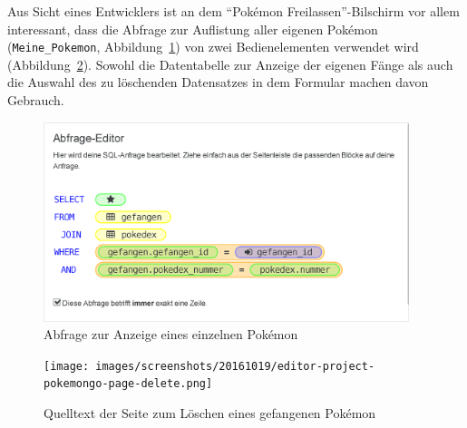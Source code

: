 Aus Sicht eines Entwicklers ist an dem "`Pokémon Freilassen"'-Bilschirm vor allem interessant, dass die Abfrage zur Auflistung aller eigenen Pokémon (\texttt{Meine\_Pokemon}, Abbildung~\ref{fig:project-pokemongo-query-single-pokemon}) von zwei Bedienelementen verwendet wird (Abbildung~\ref{fig:project-pokemongo-page-delete}). Sowohl die Datentabelle zur Anzeige der eigenen Fänge als auch die Auswahl des zu löschenden Datensatzes in dem Formular machen davon Gebrauch.

\begin{figure}[p]
  \centering \includegraphics[width=0.95\textwidth]{images/screenshots/20161019/editor-project-pokemongo-query-single-pokemon}
  \caption{Abfrage zur Anzeige eines einzelnen Pokémon}
  \label{fig:project-pokemongo-query-single-pokemon}
\end{figure}

\begin{figure}[p]
  \centering \texttt{[image: images/screenshots/20161019/editor-project-pokemongo-page-delete.png]}
  \caption{Quelltext der Seite zum Löschen eines gefangenen Pokémon}
  \label{fig:project-pokemongo-page-delete}
\end{figure}

